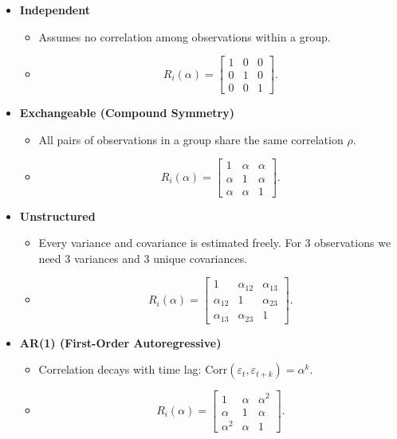 \documentclass[
  letterpaper,
  DIV=11,
  numbers=noendperiod]{scrreprt}
\providecommand{\tightlist}{%
  \setlength{\itemsep}{0pt}\setlength{\parskip}{0pt}}\usepackage{longtable,booktabs,array}
\begin{document}
\begin{itemize}
\item
  \textbf{Independent}

  \begin{itemize}
  \tightlist
  \item
    Assumes no correlation among observations within a group.\\
  \item
    \[
    R_i(\alpha) = \begin{bmatrix}
    1 & 0 & 0 \\
    0 & 1 & 0 \\
    0 & 0 & 1
    \end{bmatrix}.
    \]
  \end{itemize}
\item
  \textbf{Exchangeable (Compound Symmetry)}

  \begin{itemize}
  \tightlist
  \item
    All pairs of observations in a group share the same correlation
    \(\rho\).\\
  \item
    \[
    R_i(\alpha) = \begin{bmatrix}
    1 & \alpha & \alpha \\
    \alpha & 1 & \alpha\\
    \alpha & \alpha & 1
    \end{bmatrix}.
    \]
  \end{itemize}
\item
  \textbf{Unstructured}

  \begin{itemize}
  \tightlist
  \item
    Every variance and covariance is estimated freely. For 3
    observations we need 3 variances and 3 unique covariances.\\
  \item
    \[
    R_i(\alpha) = \begin{bmatrix}
    1 & \alpha_{12} & \alpha_{13} \\
    \alpha_{12} & 1 & \alpha_{23} \\
    \alpha_{13} & \alpha_{23} & 1
    \end{bmatrix}.
    \]
  \end{itemize}
\item
  \textbf{AR(1) (First-Order Autoregressive)}

  \begin{itemize}
  \tightlist
  \item
    Correlation decays with time lag:
    \(\text{Corr}(\varepsilon_t,\varepsilon_{t+k}) = \alpha^k\).\\
  \item
    \[
    R_i(\alpha) = \begin{bmatrix}
    1 & \alpha & \alpha^2 \\
    \alpha & 1 & \alpha \\
    \alpha^2 & \alpha & 1
    \end{bmatrix}.
    \]
  \end{itemize}
\end{itemize}
\end{document}
